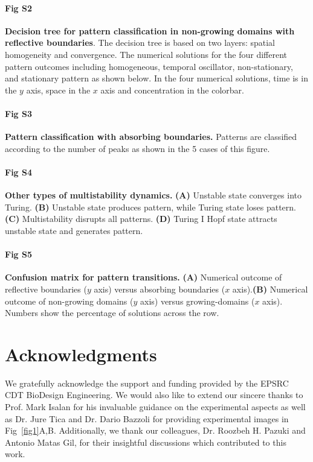 \documentclass[10pt,letterpaper]{article}
\begin{document}
    
\paragraph*{Fig S2}
\label{sup_fig2}
{\bf Decision tree for pattern classification in non-growing domains with reflective boundaries}. The decision tree is based on two layers: spatial homogeneity and convergence. The numerical solutions for the four different pattern outcomes including  homogeneous, temporal oscillator, non-stationary, and stationary pattern as shown below. In the four numerical solutions, time is in the $y$ axis, space in the $x$ axis and concentration in the colorbar.

\paragraph*{Fig S3}
\label{sup_fig3}
{\bf Pattern classification with absorbing boundaries.} Patterns are classified according to the number of peaks as shown in the 5 cases of this figure. 


\paragraph*{Fig S4}
\label{sup_fig4}
{\bf Other types of multistability dynamics.} \textbf{(A)} Unstable state converges into Turing. \textbf{(B)} Unstable state produces pattern, while Turing state loses pattern. \textbf{(C)} Multistability disrupts all patterns. \textbf{(D)} Turing I Hopf state attracts unstable state and generates pattern.


\paragraph*{Fig S5}
\label{sup_fig5}
{\bf Confusion matrix for pattern transitions.} \textbf{(A)} Numerical outcome of reflective boundaries ($y$ axis) versus absorbing boundaries ($x$ axis).\textbf{(B)} Numerical outcome of non-growing domains ($y$ axis) versus growing-domains ($x$ axis). Numbers show the percentage of solutions across the row.


\section*{Acknowledgments}
We gratefully acknowledge the support and funding provided by the EPSRC CDT BioDesign Engineering. We would also like to extend our sincere thanks to Prof. Mark Isalan for his invaluable guidance on the experimental aspects as well as Dr. Jure Tica and Dr. Dario Bazzoli for providing experimental images in Fig~\ref{fig1}A,B. Additionally, we thank our colleagues, Dr. Roozbeh H. Pazuki
 and Antonio Matas Gil, for their insightful discussions which contributed to this work.
\end{document}
